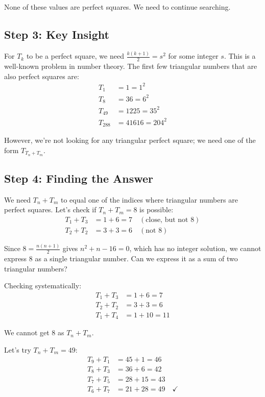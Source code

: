 \documentclass[12pt]{article}
\begin{document}
None of these values are perfect squares. We need to continue searching.

\subsection*{Step 3: Key Insight}

For $T_k$ to be a perfect square, we need $\frac{k(k+1)}{2} = s^2$ for some integer $s$. This is a well-known problem in number theory. The first few triangular numbers that are also perfect squares are:
\begin{align*}
T_1 &= 1 = 1^2 \\
T_8 &= 36 = 6^2 \\
T_{49} &= 1225 = 35^2 \\
T_{288} &= 41616 = 204^2
\end{align*}

However, we're not looking for any triangular perfect square; we need one of the form $T_{T_n + T_m}$.

\subsection*{Step 4: Finding the Answer}

We need $T_n + T_m$ to equal one of the indices where triangular numbers are perfect squares. Let's check if $T_n + T_m = 8$ is possible:
\begin{align*}
T_1 + T_3 &= 1 + 6 = 7 \quad (\text{close, but not } 8) \\
T_2 + T_2 &= 3 + 3 = 6 \quad (\text{not } 8)
\end{align*}

Since $8 = \frac{n(n+1)}{2}$ gives $n^2 + n - 16 = 0$, which has no integer solution, we cannot express 8 as a single triangular number. Can we express it as a sum of two triangular numbers?

Checking systematically:
\begin{align*}
T_1 + T_3 &= 1 + 6 = 7 \\
T_2 + T_2 &= 3 + 3 = 6 \\
T_1 + T_4 &= 1 + 10 = 11
\end{align*}

We cannot get 8 as $T_n + T_m$.

Let's try $T_n + T_m = 49$:
\begin{align*}
T_9 + T_1 &= 45 + 1 = 46 \\
T_8 + T_3 &= 36 + 6 = 42 \\
T_7 + T_5 &= 28 + 15 = 43 \\
T_6 + T_7 &= 21 + 28 = 49 \quad \checkmark
\end{align*}
\end{document}
